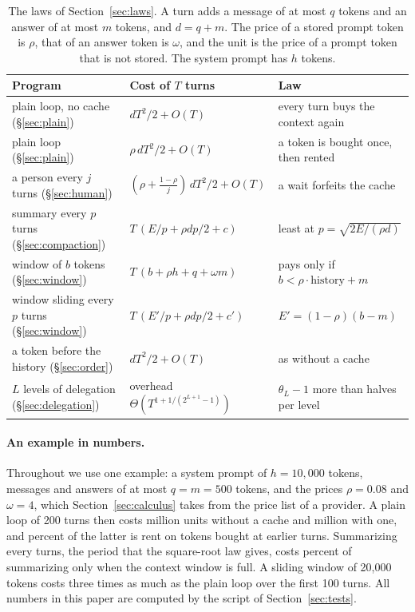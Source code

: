 \documentclass[acmsmall,nonacm,screen]{acmart}
\begin{document}
\begin{table}[t]
\caption{The laws of Section~\ref{sec:laws}. A turn adds a message of at most $q$ tokens and an
answer of at most $m$ tokens, and $d = q + m$. The price of a stored prompt token is $\rho$,
that of an answer token is $\omega$, and the unit is the price of a prompt token that is not
stored. The system prompt has $h$ tokens.}
\label{tab:laws}
\small
\begin{tabular}{@{}lll@{}}
\toprule
Program & Cost of $T$ turns & Law \\
\midrule
plain loop, no cache (\S\ref{sec:plain}) & $dT^2/2 + O(T)$ & every turn buys the context again \\
plain loop (\S\ref{sec:plain}) & $\rho\,dT^2/2 + O(T)$ & a token is bought once, then rented \\
a person every $j$ turns (\S\ref{sec:human}) & $(\rho + \frac{1-\rho}{j})\,dT^2/2 + O(T)$ & a wait forfeits the cache \\
summary every $p$ turns (\S\ref{sec:compaction}) & $T\,(E/p + \rho dp/2 + c)$ & least at $p = \sqrt{2E/(\rho d)}$ \\
window of $b$ tokens (\S\ref{sec:window}) & $T\,(b + \rho h + q + \omega m)$ & pays only if $b < \rho \cdot \text{history} + m$ \\
window sliding every $p$ turns (\S\ref{sec:window}) & $T\,(E'/p + \rho dp/2 + c')$ & $E' = (1-\rho)(b - m)$ \\
a token before the history (\S\ref{sec:order}) & $dT^2/2 + O(T)$ & as without a cache \\
$L$ levels of delegation (\S\ref{sec:delegation}) & overhead $\Theta(T^{1+1/(2^{L+1}-1)})$ & $\theta_L - 1$ more than halves per level \\
\bottomrule
\end{tabular}
\end{table}

\paragraph{An example in numbers.} Throughout we use one example: a system prompt of
$h = 10{,}000$ tokens, messages and answers of at most $q = m = 500$ tokens, and the prices
$\rho = 0.08$ and $\omega = 4$, which Section~\ref{sec:calculus} takes from the price list of a
provider. A plain loop of 200 turns then costs \exBareTwoHundred{} million units without a
cache and \exCostTwoHundred{} million with one, and \exRentShare{} percent of the latter is
rent on tokens bought at earlier turns. Summarizing every \exPbest{} turns, the period that the
square-root law gives, costs \exCompShare{} percent of summarizing only when the context window
is full. A sliding window of 20,000 tokens costs three times as much as the plain loop over the
first 100 turns. All numbers in this paper are computed by the script of
Section~\ref{sec:tests}.
\end{document}
